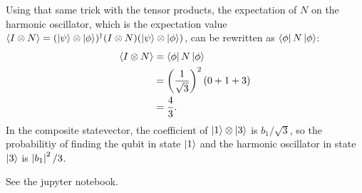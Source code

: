 \documentclass{article}
\begin{document}
Using that same trick with the tensor products, the expectation of $N$ on the harmonic oscillator, which is the expectation value $\left\langle I \otimes N \right\rangle = (\left\lvert \psi \right\rangle \otimes \left\lvert \phi \right\rangle)^\dag (I \otimes N) (\left\lvert \psi \right\rangle \otimes \left\lvert \phi \right\rangle)$, can be rewritten as $\left\langle \phi \right\rvert N \left\lvert \phi \right\rangle$:
\begin{align*}
    \left\langle I \otimes N \right\rangle &= \left\langle \phi \right\rvert N \left\lvert \phi \right\rangle \\
                       &= \left( \frac{1}{\sqrt{3}} \right)^2 \left( 0 + 1 + 3 \right) \\
                       &= \frac{4}{3}.
\end{align*}
In the composite statevector, the coefficient of $\left\lvert 1 \right\rangle \otimes \left\lvert 3 \right\rangle$ is $b_1/\sqrt{3}$, so the probabilitiy of finding the qubit in state $\left\lvert 1 \right\rangle$ and the harmonic oscillator in state $\left\lvert 3 \right\rangle$ is $\left\lvert b_1 \right\rvert^2/3$.

\bigskip
\begin{prob}
\end{prob}
See the jupyter notebook.



\end{document}
